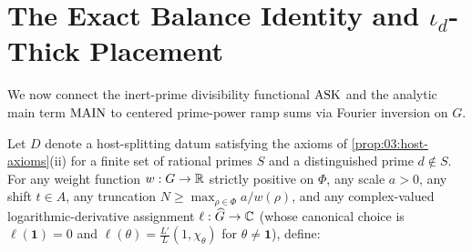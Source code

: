 \section{The Exact Balance Identity and $\iota_d$-Thick Placement}
\label{sec:03:balance}

We now connect the inert-prime divisibility functional $\mathrm{ASK}$ and the analytic main term $\mathrm{MAIN}$ to centered prime-power ramp sums via Fourier inversion on $G$.

Let $D$ denote a host-splitting datum satisfying the axioms of \cref{prop:03:host-axioms}(ii) for a finite set of rational primes $S$ and a distinguished prime $d \notin S$. For any weight function $w : G \to \mathbb{R}$ strictly positive on $\Phi$, any scale $a > 0$, any shift $t \in A$, any truncation $N \ge \max_{\rho \in \Phi} a / w(\rho)$, and any complex-valued logarithmic-derivative assignment $\ell : \widehat{G} \to \mathbb{C}$ (whose canonical choice is $\ell(\mathbf{1}) = 0$ and $\ell(\theta) = \frac{L'}{L}(1, \chi_\theta)$ for $\theta \neq \mathbf{1}$), define:
